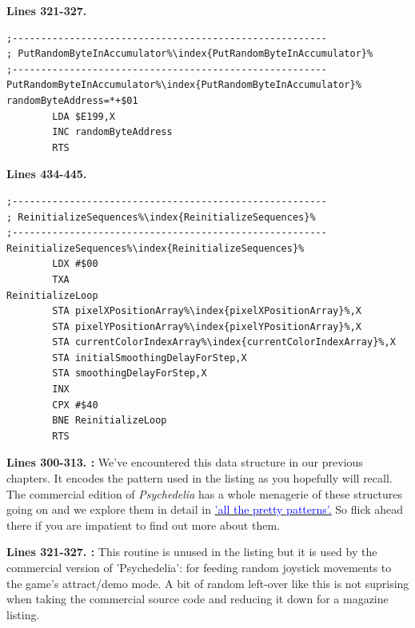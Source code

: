 \textbf{Lines 321-327. }
\begin{lstlisting}[caption= Random\, unused\, feels like a metaphor.,escapechar=\%]
;-------------------------------------------------------
; PutRandomByteInAccumulator%\index{PutRandomByteInAccumulator}%
;-------------------------------------------------------
PutRandomByteInAccumulator%\index{PutRandomByteInAccumulator}%   
randomByteAddress=*+$01
        LDA $E199,X
        INC randomByteAddress
        RTS 
\end{lstlisting}
\textbf{Lines 434-445. }
\begin{lstlisting}[caption = Fill our pixel arrays with zeros.,escapechar=\%]
;-------------------------------------------------------
; ReinitializeSequences%\index{ReinitializeSequences}%
;-------------------------------------------------------
ReinitializeSequences%\index{ReinitializeSequences}%   
        LDX #$00
        TXA 
ReinitializeLoop   
        STA pixelXPositionArray%\index{pixelXPositionArray}%,X
        STA pixelYPositionArray%\index{pixelYPositionArray}%,X
        STA currentColorIndexArray%\index{currentColorIndexArray}%,X
        STA initialSmoothingDelayForStep,X
        STA smoothingDelayForStep,X
        INX 
        CPX #$40
        BNE ReinitializeLoop
        RTS 

\end{lstlisting}
\clearpage

\textbf{Lines 300-313. :} We've encountered this data structure in our previous chapters. It encodes the pattern used in the listing as you hopefully will recall.
The commercial edition of \textit{Psychedelia} has a whole menagerie of these structures going on and we explore them in detail in
\hyperref[sec:patterns]{\textcolor{blue}{'all the pretty patterns'.}} So flick ahead there if you are impatient to find out more about them. 

\bigskip
\bigskip
\bigskip
\bigskip
\bigskip
\bigskip
\bigskip
\bigskip
\bigskip
\bigskip
\bigskip
\bigskip
\textbf{Lines 321-327.
:}
This routine is unused in the listing but it is used by the commercial version
of 'Psychedelia': for feeding random joystick movements to the game's
attract/demo mode.  A bit of random left-over like this is not suprising when
taking the commercial source code and reducing it down for a magazine listing.

